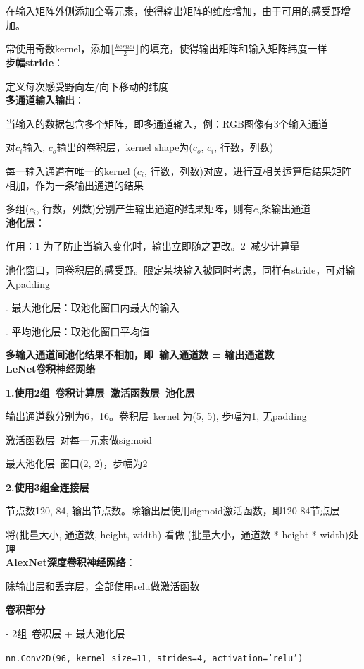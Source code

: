 \documentclass[UTF8]{ctexart}
\begin{document}
  在输入矩阵外侧添加全零元素，使得输出矩阵的维度增加，由于可用的感受野增加。

  常使用奇数kernel，添加$\lfloor \frac{kernel}{2}\rfloor $的填充，使得输出矩阵和输入矩阵纬度一样\\
\textbf{步幅stride}：

  定义每次感受野向左/向下移动的纬度\\
\textbf{多通道输入输出}：

  当输入的数据包含多个矩阵，即多通道输入，例：RGB图像有3个输入通道

  对$c_i$输入, $c_o$输出的卷积层，kernel shape为($c_o$, $c_i$, 行数，列数)

  \quad 每一输入通道有唯一的kernel ($c_i$, 行数，列数)对应，进行互相关运算后结果矩阵相加，作为一条输出通道的结果

  \quad 多组($c_i$, 行数，列数)分别产生输出通道的结果矩阵，则有$c_o$条输出通道\\
\textbf{池化层}：
  
  作用：1 为了防止当输入变化时，输出立即随之更改。2\ 减少计算量

  池化窗口，同卷积层的感受野。限定某块输入被同时考虑，同样有stride，可对输入padding

  . 最大池化层：取池化窗口内最大的输入

  . 平均池化层：取池化窗口平均值

  \textbf{多输入通道间池化结果不相加，即\ 输入通道数 = 输出通道数}\\
\textbf{LeNet卷积神经网络}

  \textbf{1.使用2组\ 卷积计算层\ 激活函数层\ 池化层}

  \quad 输出通道数分别为6，16。卷积层\ kernel 为(5, 5), 步幅为1, 无padding

  \quad 激活函数层\ 对每一元素做sigmoid

  \quad 最大池化层\ 窗口(2, 2)，步幅为2

  \textbf{2.使用3组全连接层}

  \quad 节点数120, 84, 输出节点数。除输出层使用sigmoid激活函数，即120 84节点层

  \quad 将(批量大小, 通道数, height, width) 看做 (批量大小，通道数 * height * width)处理\\
\textbf{AlexNet深度卷积神经网络}：

  除输出层和丢弃层，全部使用relu做激活函数

  \textbf{卷积部分}
  
  \quad - 2组\ 卷积层 + 最大池化层
  
  \quad \texttt{nn.Conv2D(96, kernel\_size=11, strides=4, activation='relu')}
\end{document}

